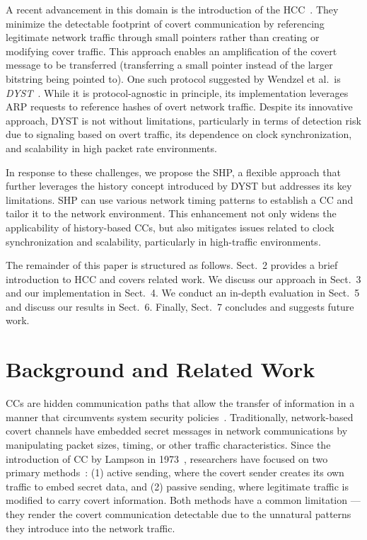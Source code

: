 \documentclass[journal]{IEEEtran}
\begin{document}
A recent advancement in this domain is the introduction of the \ac{HCC}~\cite{DYST22}. They minimize the detectable footprint of covert communication by referencing legitimate network traffic through small pointers rather than creating or modifying cover traffic. This approach enables an amplification of the covert message to be transferred (transferring a small pointer instead of the larger bitstring being pointed to). One such protocol suggested by Wendzel et al.\ is \textit{\ac{DYST}}~\cite{DYST22}. While it is protocol-agnostic in principle, its implementation leverages ARP requests to reference hashes of overt network traffic. Despite its innovative approach, \ac{DYST} is not without limitations, particularly in terms of detection risk due to signaling based on overt traffic, its dependence on clock synchronization, and scalability in high packet rate environments.

In response to these challenges, we propose the \ac{SHP}, a flexible approach that further leverages the history concept introduced by \ac{DYST} but addresses its key limitations. \ac{SHP} can use various network timing patterns to establish a \ac{CC} and tailor it to the network environment. This enhancement not only widens the applicability of history-based \ac{CC}s, but also mitigates issues related to clock synchronization and scalability, particularly in high-traffic environments.

The remainder of this paper is structured as follows. Sect.~2 provides a brief introduction to \ac{HCC} and covers related work. We discuss our approach in Sect.~3 and our implementation in Sect.~4. We conduct an in-depth evaluation in Sect.~5 and discuss our results in Sect.~6. Finally, Sect.~7 concludes and suggests future work.

\section{Background and Related Work}
\ac{CC}s are hidden communication paths that allow the transfer of information in a manner that circumvents system security policies~\cite{wendzelpatternsurvey15}. Traditionally, network-based covert channels have embedded secret messages in network communications by manipulating packet sizes, timing, or other traffic characteristics. Since the introduction of \ac{CC} by Lampson in 1973~\cite{lamp73}, researchers have focused on two primary methods~\cite{DYST22}: (1) active sending, where the covert sender creates its own traffic to embed secret data, and (2) passive sending, where legitimate traffic is modified to carry covert information. Both methods have a common limitation — they render the covert communication detectable due to the unnatural patterns they introduce into the network traffic. 
\end{document}

